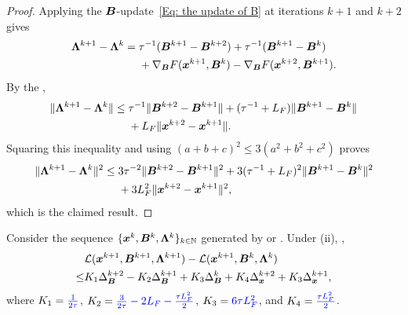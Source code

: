 \begin{proof}
    Applying the $\bm{B}$-update~\eqref{Eq: the update of B} at iterations $k+1$ and $k+2$ gives
    \begin{align*}
    \bm{\Lambda}^{k+1}-\bm{\Lambda}^k
    ={}&\tau^{-1}(\bm{B}^{k+1}-\bm{B}^{k+2})
    +\tau^{-1}(\bm{B}^{k+1}-\bm{B}^k)\\
    &+\nabla_{\bm{B}}F(\bm{x}^{k+1},\bm{B}^k)
    -\nabla_{\bm{B}}F(\bm{x}^{k+2},\bm{B}^{k+1}).
    \end{align*}
    By the ,
    \begin{align*}
    \|\bm{\Lambda}^{k+1}-\bm{\Lambda}^k\|
    \leq{}&\tau^{-1}\|\bm{B}^{k+2}-\bm{B}^{k+1}\|
    +(\tau^{-1}+L_F)\|\bm{B}^{k+1}-\bm{B}^k\|\\
    &+L_F\|\bm{x}^{k+2}-\bm{x}^{k+1}\|.
    \end{align*}
    Squaring this inequality and using $(a+b+c)^2\leq3(a^2+b^2+c^2)$ proves
    \begin{align}
    \|\bLmbd^{k+1}-\bLmbd^k\|^2
    \leq{}&3\tau^{-2}\|\bB^{k+2}-\bB^{k+1}\|^2
    +3(\tau^{-1}+L_F)^2\|\bB^{k+1}-\bB^k\|^2\notag\\
    &+3L_F^2\|\bx^{k+2}-\bx^{k+1}\|^2,
    \label{Eq: dual boundedness in proof}
    \end{align}
    which is the claimed result.
\end{proof}

\begin{lemma}
    \label{app:primal-dual-progress-proof}
\label{Lemma: One-iteration progress of B and Lambda}
    Consider the sequence $\{
    \bm{x}^{k}, \bm{B}^{k}, \bm{\Lambda}^{k}\}_{k \in \mathbb{N}}$ generated by 
    or . Under (ii), ,
    \begin{align}
\label{item: B and Lambda}
&\calL(\bx^{k+1}, \bB^{k+1}, \bLmbd^{k+1}) - \calL(\bx^{k+1}, \bB^{k}, \bLmbd^{k}) \notag \\
\le& K_1 \Delta_{\bB}^{k+2} - K_2 \Delta_{\bB}^{k+1} + K_3 \Delta_{\bB}^{k}
+ K_4 \Delta_{\bx}^{k+2} + K_3 \Delta_{\bx}^{k+1},
\end{align}
where $K_1={\color{blue}\frac{1}{2\tau}}$, $K_2={\color{blue}\frac{3}{2\tau}-2L_F-\frac{\tau L_F^2}{2}}$, $K_3={\color{blue}6\tau L_F^2}$, and $K_4={\color{blue}\frac{\tau L_F^2}{2}}$.
\end{lemma}

